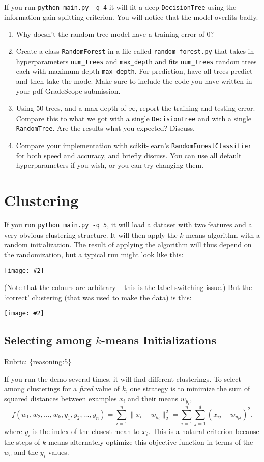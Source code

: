 \documentclass{article}
\def\rubric#1{\gre{Rubric: \{#1\}}}{}
\def\blu#1{{\color{blu}#1}}
\def\gre#1{{\color{gre}#1}}
\def\norm#1{\|#1\|}
\newcommand{\centerfig}[2]{\begin{center}\texttt{[image: \#2]}\end{center}}
\def\enum#1{\begin{enumerate}#1\end{enumerate}}
\begin{document}
If you run \texttt{python main.py -q 4} it will fit a deep \texttt{DecisionTree}
using the information gain splitting criterion. You will notice that the model overfits badly.




\blu{
\enum{
\item Why doesn't the random tree model have a training error of 0?
\item Create a class \texttt{RandomForest} in a file called \texttt{random\string_forest.py} that takes in hyperparameters \texttt{num\string_trees} and \texttt{max\string_depth} and
fits \texttt{num\string_trees} random trees each with maximum depth \texttt{max\string_depth}. For prediction, have all trees predict and then take the mode. Make sure to include the code you have written in your pdf GradeScope submission.
\item Using 50 trees, and a max depth of $\infty$, report the training and testing error. Compare this to what we got with a single \texttt{DecisionTree} and with a single \texttt{RandomTree}. Are the results what you expected? Discuss.
\item Compare your implementation with scikit-learn's \texttt{RandomForestClassifier} for both speed and accuracy, and briefly discuss. You can use all default hyperparameters if you wish, or you can try changing them.
}
}

\section{Clustering}

If you run \verb|python main.py -q 5|, it will load a dataset with two features
and a very obvious clustering structure. It will then apply the $k$-means algorithm
with a random initialization. The result of applying the
algorithm will thus depend on the randomization, but a typical run might look like this:
\centerfig{.5}{../figs/kmeans_basic.png}
(Note that the colours are arbitrary -- this is the label switching issue.)
But the `correct' clustering (that was used to make the data) is this:
\centerfig{.5}{../figs/kmeans_good.png}


\subsection{Selecting among $k$-means Initializations}
\rubric{reasoning:5}

If you run the demo several times, it will find different clusterings. To select among clusterings for a \emph{fixed} value of $k$, one strategy is to minimize the sum of squared distances between examples $x_i$ and their means $w_{y_i}$,
\[
f(w_1,w_2,\dots,w_k,y_1,y_2,\dots,y_n) = \sum_{i=1}^n \norm{x_i - w_{y_i}}_2^2 = \sum_{i=1}^n \sum_{j=1}^d (x_{ij} - w_{y_ij})^2.
\]
 where $y_i$ is the index of the closest mean to $x_i$. This is a natural criterion because the steps of $k$-means alternately optimize this objective function in terms of the $w_c$ and the $y_i$ values.
\end{document}
